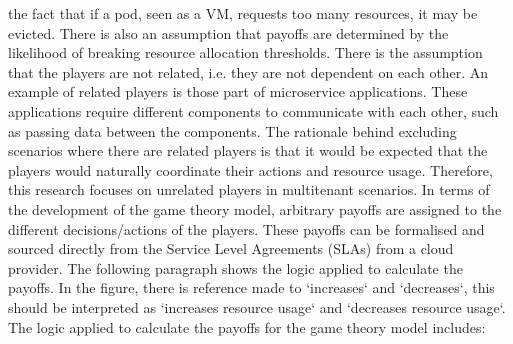 the fact that if a pod, seen as a VM, requests too many resources, it
may be evicted. There is also an assumption that payoffs are determined
by the likelihood of breaking resource allocation thresholds.
\newline\newline
There is the assumption that the players are not related, i.e. they
are not dependent on each other. An example of related players is those
part of microservice applications. These applications require different
components to communicate with each other, such as passing data between
the components. The rationale behind excluding scenarios where there are
related players is that it would be expected that the players would
naturally coordinate their actions and resource usage.
\newline\newline
Therefore, this research focuses on unrelated players in multitenant
scenarios. In terms of the development of the game theory model,
arbitrary payoffs are assigned to the different decisions/actions of the
players. These payoffs can be formalised and sourced directly from the
Service Level Agreements (SLAs) from a cloud provider. The following
paragraph shows the logic applied to calculate the payoffs. In the figure,
there is reference made to `increases` and `decreases`, this should be
interpreted as `increases resource usage` and `decreases resource
usage`.
\newline\newline
The  logic applied to calculate the payoffs for the game
theory model includes:

